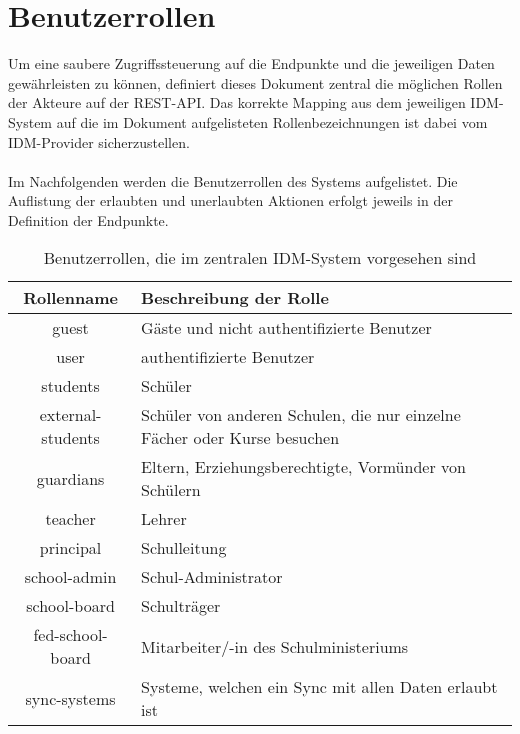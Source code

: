 \section{Benutzerrollen}
Um eine saubere Zugriffssteuerung auf die Endpunkte und die jeweiligen Daten gewährleisten zu können, definiert dieses Dokument zentral die möglichen Rollen der Akteure auf der REST-API. Das korrekte Mapping aus dem jeweiligen IDM-System auf die im Dokument aufgelisteten Rollenbezeichnungen ist dabei vom IDM-Provider sicherzustellen.\\
\\
Im Nachfolgenden werden die Benutzerrollen des Systems aufgelistet. Die Auflistung
der erlaubten und unerlaubten Aktionen erfolgt jeweils in der Definition der Endpunkte.


\begin{table}[htb]
	\begin{tabularx}{\textwidth}{|c|X|}
		\hline
\textbf{Rollenname} & \textbf{Beschreibung der Rolle} \\ \hline
guest & Gäste und nicht authentifizierte Benutzer \\ \hline
user & authentifizierte Benutzer \\ \hline
students & Schüler \\ \hline
external-students & Schüler von anderen Schulen, die nur einzelne Fächer oder Kurse besuchen \\ \hline
guardians & Eltern, Erziehungsberechtigte, Vormünder von Schülern \\ \hline
teacher & Lehrer \\ \hline
principal & Schulleitung \\ \hline
school-admin & Schul-Administrator \\ \hline
school-board & Schulträger \\ \hline
fed-school-board & Mitarbeiter/-in des Schulministeriums \\ \hline
sync-systems & Systeme, welchen ein Sync mit allen Daten erlaubt ist \\ \hline

	\end{tabularx}

		\caption{Benutzerrollen, die im zentralen IDM-System vorgesehen sind}
		\label{tab:intro:roles}
\end{table}